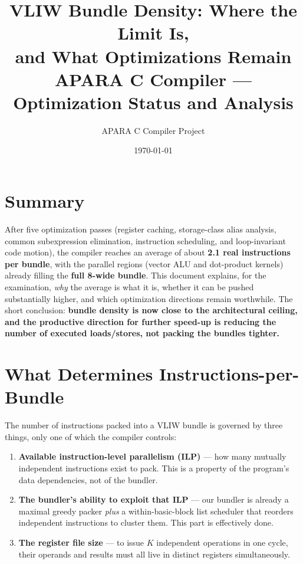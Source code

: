 \documentclass[11pt,a4paper]{article}
\title{\textbf{VLIW Bundle Density: Where the Limit Is, \\ and What Optimizations Remain}\\[2mm]
\large APARA C Compiler --- Optimization Status and Analysis}
\author{APARA C Compiler Project}
\date{\today}
\begin{document}
\maketitle
\thispagestyle{fancy}
\vspace{-6mm}

\section{Summary}

After five optimization passes (register caching, storage-class alias analysis, common
subexpression elimination, instruction scheduling, and loop-invariant code motion), the
compiler reaches an average of about \textbf{2.1 real instructions per bundle}, with the
parallel regions (vector ALU and dot-product kernels) already filling the \textbf{full
8-wide bundle}. This document explains, for the examination, \emph{why} the average is what
it is, whether it can be pushed substantially higher, and which optimization directions
remain worthwhile. The short conclusion: \textbf{bundle density is now close to the
architectural ceiling, and the productive direction for further speed-up is reducing the
number of executed loads/stores, not packing the bundles tighter.}

\section{What Determines Instructions-per-Bundle}

The number of instructions packed into a VLIW bundle is governed by three things, only one
of which the compiler controls:

\begin{enumerate}[leftmargin=*]
  \item \textbf{Available instruction-level parallelism (ILP)} --- how many mutually
        independent instructions exist to pack. This is a property of the program's data
        dependencies, not of the bundler.
  \item \textbf{The bundler's ability to exploit that ILP} --- our bundler is already a
        maximal greedy packer \emph{plus} a within-basic-block list scheduler that reorders
        independent instructions to cluster them. This part is effectively done.
  \item \textbf{The register file size} --- to issue $K$ independent operations in one
        cycle, their operands and results must all live in distinct registers
        simultaneously.
\end{enumerate}
\end{document}

